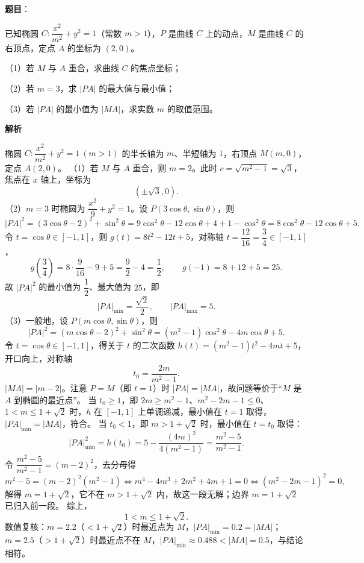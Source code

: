 \begin{answer}

\textbf{题目}：

已知椭圆 $C:\dfrac{x^2}{m^2}+y^2=1$（常数 $m>1$），$P$ 是曲线 $C$ 上的动点，$M$ 是曲线 $C$ 的右顶点，定点 $A$ 的坐标为 $(2,0)$。

（1）若 $M$ 与 $A$ 重合，求曲线 $C$ 的焦点坐标；

（2）若 $m=3$，求 $|PA|$ 的最大值与最小值；

（3）若 $|PA|$ 的最小值为 $|MA|$，求实数 $m$ 的取值范围。

\textbf{解析}

椭圆 $C:\dfrac{x^2}{m^2}+y^2=1\ (m>1)$ 的半长轴为 $m$、半短轴为 $1$，右顶点 $M(m,0)$，定点 $A(2,0)$。
（1）若 $M$ 与 $A$ 重合，则 $m=2$。此时 $c=\sqrt{m^2-1}=\sqrt3$，焦点在 $x$ 轴上，坐标为
\nopagebreak[4]
\[(\pm\sqrt3,0).\]
（2）$m=3$ 时椭圆为 $\dfrac{x^2}{9}+y^2=1$。设 $P(3\cos\theta,\sin\theta)$，则
\nopagebreak[4]
\[|PA|^2=(3\cos\theta-2)^2+\sin^2\theta=9\cos^2\theta-12\cos\theta+4+1-\cos^2\theta=8\cos^2\theta-12\cos\theta+5.\]
令 $t=\cos\theta\in[-1,1]$，则 $g(t)=8t^2-12t+5$，对称轴 $t=\dfrac{12}{16}=\dfrac34\in[-1,1]$，
\nopagebreak[4]
\[g\left(\frac34\right)=8\cdot\frac9{16}-9+5=\frac92-4=\frac12,\qquad g(-1)=8+12+5=25.\]
故 $|PA|^2$ 的最小值为 $\dfrac12$、最大值为 $25$，即
\nopagebreak[4]
\[|PA|_{\min}=\frac{\sqrt2}{2},\qquad |PA|_{\max}=5.\]
（3）一般地，设 $P(m\cos\theta,\sin\theta)$，则
\nopagebreak[4]
\[|PA|^2=(m\cos\theta-2)^2+\sin^2\theta=(m^2-1)\cos^2\theta-4m\cos\theta+5.\]
令 $t=\cos\theta\in[-1,1]$，得关于 $t$ 的二次函数 $h(t)=(m^2-1)t^2-4mt+5$，开口向上，对称轴
\nopagebreak[4]
\[t_0=\frac{2m}{m^2-1}.\]
$|MA|=|m-2|$。注意 $P=M$（即 $t=1$）时 $|PA|=|MA|$，故问题等价于“$M$ 是 $A$ 到椭圆的最近点”。
当 $t_0\geqslant1$，即 $2m\geqslant m^2-1$、$m^2-2m-1\leqslant0$、$1<m\leqslant1+\sqrt2$ 时，$h$ 在 $[-1,1]$ 上单调递减，最小值在 $t=1$ 取得，$|PA|_{\min}=|MA|$，符合。
当 $t_0<1$，即 $m>1+\sqrt2$ 时，最小值在 $t=t_0$ 取得：
\nopagebreak[4]
\[|PA|_{\min}^2=h(t_0)=5-\frac{(4m)^2}{4(m^2-1)}=\frac{m^2-5}{m^2-1}.\]
令 $\dfrac{m^2-5}{m^2-1}=(m-2)^2$，去分母得
\nopagebreak[4]
\[m^2-5=(m-2)^2(m^2-1)\iff m^4-4m^3+2m^2+4m+1=0\iff\left(m^2-2m-1\right)^2=0,\]
解得 $m=1+\sqrt2$，它不在 $m>1+\sqrt2$ 内，故这一段无解；边界 $m=1+\sqrt2$ 已归入前一段。
综上，
\nopagebreak[4]
\[1<m\leqslant1+\sqrt2.\]
数值复核：$m=2.2$（$<1+\sqrt2$）时最近点为 $M$，$|PA|_{\min}=0.2=|MA|$；$m=2.5$（$>1+\sqrt2$）时最近点不在 $M$，$|PA|_{\min}\approx0.488<|MA|=0.5$，与结论相符。


\end{answer}
